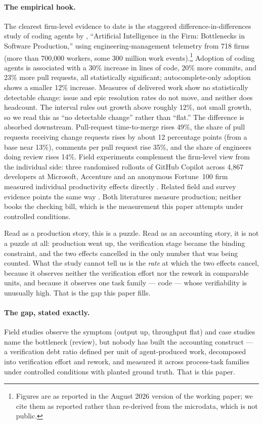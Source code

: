 \documentclass[11pt]{article}
\begin{document}
\paragraph{The empirical hook.}
The clearest firm-level evidence to date is the staggered difference-in-differences study of
coding agents by \citet{chen2026}, ``Artificial Intelligence in the Firm: Bottlenecks in Software
Production,'' using engineering-management telemetry from 718 firms (more than 700{,}000 workers,
some 300 million work events).\footnote{Figures are as reported in the August 2026 version of the
working paper; we cite them as reported rather than re-derived from the microdata, which is not
public.} Adoption of coding agents is associated with a 30\% increase in lines of code, 20\% more
commits, and 23\% more pull requests, all statistically significant; autocomplete-only adoption
shows a smaller 12\% increase. Measures of delivered work show no statistically detectable change:
issue and epic resolution rates do not move, and neither does headcount. The interval rules out
growth above roughly 12\%, not small growth, so we read this as ``no detectable change'' rather
than ``flat.'' The difference is absorbed downstream. Pull-request time-to-merge rises 49\%, the
share of pull requests receiving change requests rises by about 12 percentage points (from a base
near 13\%), comments per pull request rise 35\%, and the share of engineers doing review rises
14\%. Field experiments complement the firm-level view from the individual side: three randomised
rollouts of GitHub Copilot across 4{,}867 developers at Microsoft, Accenture and an anonymous
Fortune~100 firm measured individual productivity effects directly \citep{cui2024}. Related field and survey evidence points the same way
\citep{demirer2026,metr2025,dora2025}. Both literatures
measure production; neither books
the checking bill, which is the measurement this paper attempts under controlled conditions.

Read as a production story, this is a puzzle. Read as an accounting story, it is not a puzzle at
all: production went up, the verification stage became the binding constraint, and the two effects
cancelled in the only number that was being counted. What the study cannot tell us is the
\emph{rate} at which the two effects cancel, because it observes neither the verification effort
nor the rework in comparable units, and because it observes one task family --- code --- whose
verifiability is unusually high. That is the gap this paper fills.

\paragraph{The gap, stated exactly.}
Field studies observe the symptom (output up, throughput flat) and case studies name the
bottleneck (review), but nobody has built the accounting construct --- a verification debt ratio
defined per unit of agent-produced work, decomposed into verification effort and rework, and
measured it across process-task families under controlled conditions with planted ground truth.
That is this paper.
\end{document}
